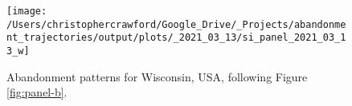 \documentclass[9pt,twocolumn,twoside,lineno]{pnas-new}
\begin{document}
\begin{figure}
\texttt{[image: /Users/christophercrawford/Google\_Drive/\_Projects/abandonment\_trajectories/output/plots/\_2021\_03\_13/si\_panel\_2021\_03\_13\_w]} \caption{Abandonment patterns for Wisconsin, USA, following Figure \ref{fig:panel-b}.}\label{fig:panel-w}
\end{figure}

\showmatmethods
\showacknow
\pnasbreak



% 
\end{document}
